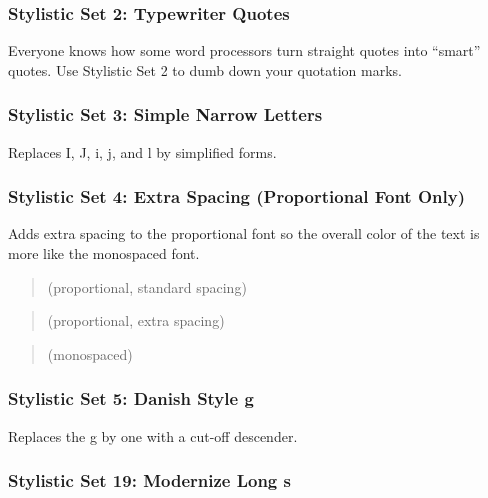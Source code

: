 \subsubsection{Stylistic Set 2: Typewriter Quotes}
Everyone knows how some word processors turn straight quotes into “smart” quotes. Use Stylistic Set 2 to dumb down your quotation marks.
\begin{quote}
{ \sample}
\end{quote}

\subsubsection{Stylistic Set 3: Simple Narrow Letters}
Replaces I, J, i, j, and l by simplified forms.
\begin{quote}
{ \sample}
\end{quote}

\subsubsection{Stylistic Set 4: Extra Spacing (Proportional Font Only)}

Adds extra spacing to the proportional font so the overall color of the text is more like the monospaced font.

\begin{quote}\raggedright
{\setmainfont{SudoUIVariable.ttf} \sample{} (proportional, standard spacing)}
\end{quote}
\begin{quote}\raggedright
{\setmainfont{SudoUIVariable.ttf}  \sample{} (proportional, extra spacing)}
\end{quote}
\begin{quote}\raggedright
{ \sample{} (monospaced)}
\end{quote}

\subsubsection{Stylistic Set 5: Danish Style g}
Replaces the g by one with a cut-off descender.
\begin{quote}
{ \sample}
\end{quote}

\subsubsection{Stylistic Set 19: Modernize Long s}

